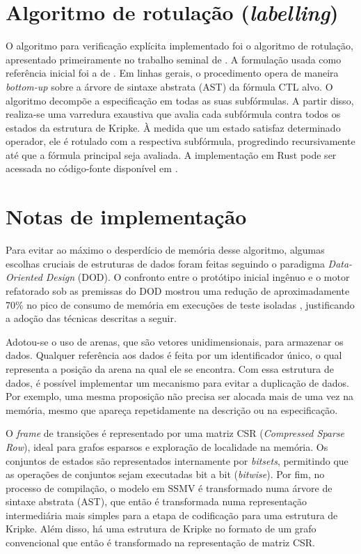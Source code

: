 \documentclass[cic,tc]{infufrgs}
\begin{document}
	\section{Algoritmo de rotulação (\textit{labelling})}
	O algoritmo para verificação explícita implementado foi o algoritmo de rotulação, apresentado primeiramente no trabalho seminal de . 
	A formulação usada como referência inicial foi a de . 
	Em linhas gerais, o procedimento opera de maneira \textit{bottom-up} sobre a árvore de sintaxe abstrata (AST) da fórmula CTL alvo. 
	O algoritmo decompõe a especificação em todas as suas subfórmulas. 
	A partir disso, realiza-se uma varredura exaustiva que avalia cada subfórmula contra todos os estados da estrutura de Kripke. 
	À medida que um estado satisfaz determinado operador, ele é rotulado com a respectiva subfórmula, progredindo recursivamente até que a fórmula principal seja avaliada.
	A implementação em Rust pode ser acessada no código-fonte disponível em .
	
	\section{Notas de implementação}
	Para evitar ao máximo o desperdício de memória desse algoritmo, algumas escolhas cruciais de estruturas de dados foram feitas seguindo o paradigma \textit{Data-Oriented Design} (DOD). 
	O confronto entre o protótipo inicial ingênuo e o motor refatorado sob as premissas do DOD mostrou uma redução de aproximadamente 70\% no pico de consumo de memória em execuções de teste isoladas \cite{llull}, justificando a adoção das técnicas descritas a seguir.
	
	Adotou-se o uso de arenas, que são vetores unidimensionais, para armazenar os dados. Qualquer referência aos dados é feita por um identificador único, o qual representa a posição da arena na qual ele se encontra. Com essa estrutura de dados, é possível implementar um mecanismo para evitar a duplicação de dados. Por exemplo, uma mesma proposição não precisa ser alocada mais de uma vez na memória, mesmo que apareça repetidamente na descrição ou na especificação.
	
	O \textit{frame} de transições é representado por uma matriz CSR (\textit{Compressed Sparse Row}), ideal para grafos esparsos e exploração de localidade na memória.
	Os conjuntos de estados são representados internamente por \textit{bitsets}, permitindo que as operações de conjuntos sejam executadas bit a bit (\textit{bitwise}).
	Por fim, no processo de compilação, o modelo em SSMV é transformado numa árvore de sintaxe abstrata (AST), que então é transformada numa representação intermediária mais simples para a etapa de codificação para uma estrutura de Kripke. Além disso, há uma estrutura de Kripke no formato de um grafo convencional que então é transformado na representação de matriz CSR.
	
\end{document}
